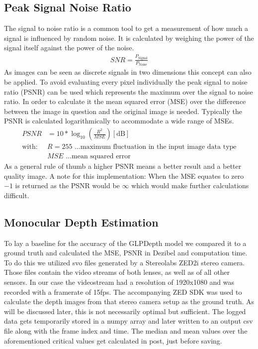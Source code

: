 \subsection{Peak Signal Noise Ratio}

The signal to noise ratio is a common tool to get a measurement of how much a signal is influenced by random noise. It is calculated by weighing the power of the signal itself against the power of the noise.
\begin{align}
    SNR = \frac{P_{\text{Signal}}}{P_{\text{Noise}}}
\end{align}
As images can be seen as discrete signals in two dimensions this concept can also be applied. To avoid evaluating every pixel individually the peak signal to noise ratio (PSNR) can be used which represents the maximum over the signal to noise ratio. In order to calculate it the mean squared error (MSE) over the difference between the image in question and the original image is needed. Typically the PSNR is calculated logarithmically to accommodate a wide range of MSEs.
\begin{align}
    PSNR &= 10 * \log_{10}(\frac{R^2}{MSE}) [\mathrm{dB}] \\
    \text{with: } & R = 255 \text{ …maximum fluctuation in the input image data type} \nonumber \\
    & MSE \text{ …mean squared error} \nonumber
\end{align}
As a general rule of thumb a higher PSNR means a better result and a better quality image.
A note for this implementation: When the MSE equates to zero $-1$ is returned as the PSNR would be $\infty$ which would make further calculations difficult.


\subsection{Monocular Depth Estimation} \label{mde_impl}

To lay a baseline for the accuracy of the GLPDepth model we compared it to a ground truth and calculated the MSE, PSNR in Dezibel and computation time. To do this we utilized svo files generated by a Stereolabs ZED2i stereo camera. Those files contain the video streams of both lenses, as well as of all other sensors. In our case the videostream had a resolution of 1920x1080 and was recorded with a framerate of 15fps.
The accompanying ZED SDK was used to calculate the depth images from that stereo camera setup as the ground truth. As will be discussed later, this is not necessarily optimal but sufficient.
The logged data gets temporarily stored in a numpy array and later written to an output csv file along with the frame index and time. The median and mean values over the aforementioned critical values get calculated in post, just before saving.


